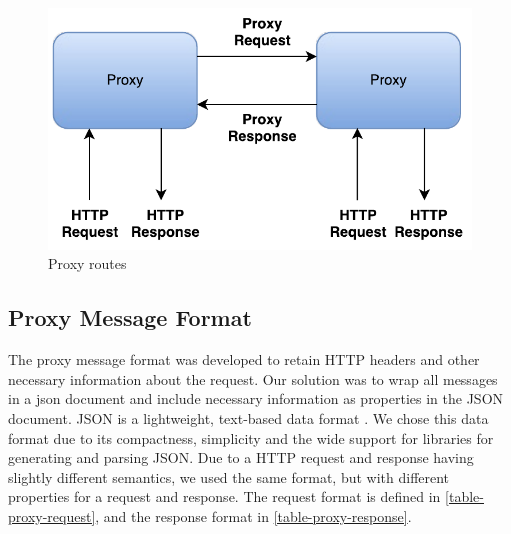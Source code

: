 \begin{figure}[h]
\centering
\includegraphics[scale=0.7]{images/dil_routes.pdf}
\caption{Proxy routes}
\label{figure:dil-routes}
\end{figure}



\subsection{Proxy Message Format}
\label{section:proxy-header-format}

The proxy message format was developed to retain HTTP headers and other
necessary information about the request. Our solution was to wrap all messages
in a \gls{json} document and include necessary information as properties in the
JSON document. JSON is a lightweight, text-based data format \cite{rfc-json}. We
chose this data format due to its compactness, simplicity and the wide support
for libraries for generating and parsing JSON. Due to a HTTP request and
response having slightly different semantics, we used the same format, but
with different properties for a request and response. The request format is
defined in \cref{table-proxy-request}, and the response format in
\cref{table-proxy-response}.


